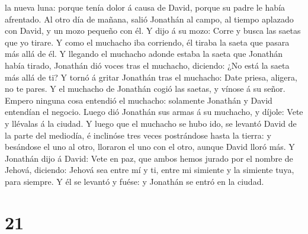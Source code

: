 la nueva luna: porque tenía dolor á causa de David, porque su padre le
había afrentado.  Al otro día de mañana, salió Jonathán
al campo, al tiempo aplazado con David, y un mozo pequeño con él.
 Y dijo á su mozo: Corre y busca las saetas que yo
tirare. Y como el muchacho iba corriendo, él tiraba la saeta que pasara
más allá de él.  Y llegando el muchacho adonde estaba la
saeta que Jonathán había tirado, Jonathán dió voces tras el muchacho,
diciendo: ¿No está la saeta más allá de ti?  Y tornó á
gritar Jonathán tras el muchacho: Date priesa, aligera, no te pares. Y
el muchacho de Jonathán cogió las saetas, y vínose á su señor.
 Empero ninguna cosa entendió el muchacho: solamente
Jonathán y David entendían el negocio.  Luego dió
Jonathán sus armas á su muchacho, y díjole: Vete y llévalas á la ciudad.
 Y luego que el muchacho se hubo ido, se levantó David de
la parte del mediodía, é inclinóse tres veces postrándose hasta la
tierra: y besándose el uno al otro, lloraron el uno con el otro, aunque
David lloró más.  Y Jonathán dijo á David: Vete en paz,
que ambos hemos jurado por el nombre de Jehová, diciendo: Jehová sea
entre mí y ti, entre mi simiente y la simiente tuya, para siempre. Y él
se levantó y fuése: y Jonathán se entró en la ciudad.

\hypertarget{section-20}{%
\section{21}\label{section-20}}

